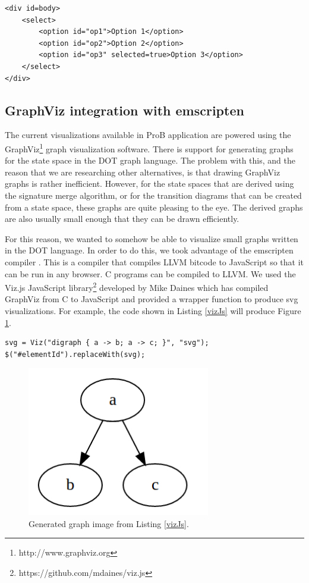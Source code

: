 \lstset{language=HTML}
\begin{lstlisting}[caption=Html generated from Listing \ref{d3Example},label=d3Result]
<div id=body>
    <select>
        <option id="op1">Option 1</option>
        <option id="op2">Option 2</option>
        <option id="op3" selected=true>Option 3</option>
    </select>
</div>
\end{lstlisting}


\subsection{GraphViz integration with emscripten}

The current visualizations available in ProB application are powered using the GraphViz\footnote{http://www.graphviz.org} graph visualization software. There is support for generating graphs for the state space in the DOT graph language. The problem with this, and the reason that we are researching other alternatives, is that drawing GraphViz graphs is rather inefficient. However, for the state spaces that are derived using the signature merge algorithm, or for the transition diagrams that can be created from a state space, these graphs are quite pleasing to the eye. The derived graphs are also usually small enough that they can be drawn efficiently.

For this reason, we wanted to somehow be able to visualize small graphs written in the DOT language. In order to do this, we took advantage of the emscripten compiler \cite{emscripten}. This is a compiler that compiles LLVM bitcode to JavaScript so that it can be run in any browser. C programs can be compiled to LLVM. We used the Viz.js JavaScript library\footnote{https://github.com/mdaines/viz.js} developed by Mike Daines which has compiled GraphViz from C to JavaScript and provided a wrapper function to produce svg visualizations. For example, the code shown in Listing \ref{vizJs} will produce Figure \ref{graphVizEx}.

\begin{lstlisting}[caption=Create a visualization with viz.js and insert it into an html page.,label=vizJs]
svg = Viz("digraph { a -> b; a -> c; }", "svg");
$("#elementId").replaceWith(svg);
\end{lstlisting}

\begin{center}
\begin{figure}[h!]
\centering
\includegraphics[width=8cm]{bilder/graphVizExample.png}
\caption{Generated graph image from Listing \ref{vizJs}.}
\label{graphVizEx}
\end{figure}
\end{center}
